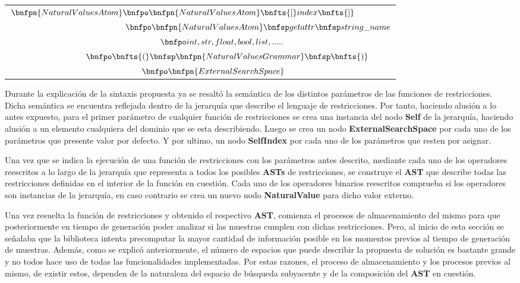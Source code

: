 \begin{longtable}{  c  }
    \\

    $\hspace{-1.5cm}\bnfpn{NaturalValuesAtom} \bnfpo \bnfpn{NaturalValuesAtom}\bnfts{[}index\bnfts{]} $                          \\
    $\hspace{4.9cm}\bnfpo \bnfpn{NaturalValuesAtom}\bnfsp getattr\bnfsp string\_name $                                           \\
    $\hspace{1.8cm}\bnfpo int, str, float, bool, list, .....$                                                                    \\
    $\hspace{2.3cm}\bnfpo \bnfts{(} \bnfsp \bnfpn{NaturalValuesGrammar}\bnfsp \bnfts{)}$                                         \\
    $\hspace{1.1cm}\bnfpo \bnfpn{ExternalSearchSpace}$
    \\
\end{longtable}

Durante la explicación de la sintaxis propuesta ya se resaltó la semántica de los distintos parámetros de las
funciones de restricciones. Dicha semántica se encuentra reflejada dentro de la jerarquía que describe el
lenguaje de restricciones. Por tanto, haciendo alusión a lo antes expuesto, para el primer parámetro de cualquier
función de restricciones se crea una instancia del nodo {\bf Self} de la jerarquía, haciendo alusión a un elemento
cualquiera del dominio que se esta describiendo. Luego se crea un nodo {\bf ExternalSearchSpace} por cada uno de los
parámetros que presente valor por defecto. Y por ultimo, un nodo {\bf SelfIndex} por cada uno de los parámetros que
resten por asignar.

Una vez que se indica la ejecución de una función de restricciones con los parámetros antes descrito, mediante
cada uno de los operadores reescritos a lo largo de la jerarquía que representa a todos los posibles {\bf ASTs} de
restricciones, se construye el {\bf AST} que describe todas las restricciones definidas en el interior de la función
en cuestión. Cada uno de los operadores binarios reescritos comprueba si los operadores son instancias de la
jerarquía, en caso contrario se crea un nuevo nodo {\bf NaturalValue} para dicho valor externo.

Una vez resuelta la función de restricciones y obtenido el respectivo {\bf AST}, comienza el procesos de almacenamiento
del mismo para que posteriormente en tiempo de generación poder analizar si las muestras cumplen con dichas
restricciones. Pero, al inicio de esta sección se señalaba que la biblioteca intenta precomputar la mayor
cantidad de información posible en los momentos previos al tiempo de generación de muestras. Además, como
se explicó anteriormente, el número de espacios que puede describir la propuesta de solución es bastante
grande y no todos hace uso de todas las funcionalidades implementadas. Por estas razones, el proceso de
almacenamiento y los procesos previos al mismo, de existir estos, dependen de la naturaleza del espacio de búsqueda
subyacente y de la composición del {\bf AST} en cuestión.

